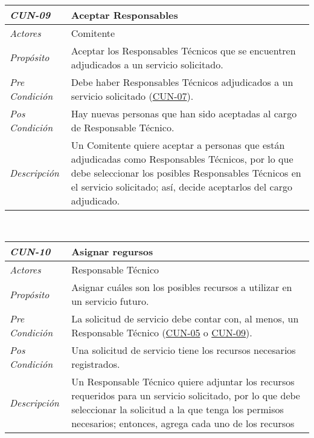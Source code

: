 \begin{center}
{\begin{tabular}{ | p{3cm} | p{12.5cm} | }
	\hline
\end{tabular}} \\[1cm]
\hypertarget{CUN-09}{%
\begin{tabular}{ | p{3cm} | p{12.5cm} | }
	\hline
	\rowcolor{lightgray}
	\hfil \textbf{\textit{CUN-09}} &
	\hfil \textbf{Aceptar Responsables} \\
	\hline
	\raggedleft \textit{Actores} & Comitente \\
	\hline
	\raggedleft \textit{Prop\'osito} & Aceptar los
	Responsables T\'ecnicos que se encuentren adjudicados
	a un servicio solicitado. \\
	\hline
	\raggedleft \textit{Pre Condici\'on} & Debe haber
	Responsables T\'ecnicos adjudicados a un servicio
	solicitado (\hyperlink{CUN-07}{CUN-07}). \\
	\hline
	\raggedleft \textit{Pos Condici\'on} & Hay nuevas
	personas que han sido aceptadas al cargo de
	Responsable T\'ecnico. \\
	\hline
	\raggedleft \textit{Descripci\'on} &
	Un Comitente quiere aceptar a personas que est\'an
	adjudicadas como Responsables T\'ecnicos, por lo que
	debe seleccionar los posibles Responsables T\'ecnicos
	en el servicio solicitado; as\'i, decide aceptarlos
	del cargo adjudicado. \\
	\hline
\end{tabular}} \\[1cm]
\hypertarget{CUN-10}{%
\begin{tabular}{ | p{3cm} | p{12.5cm} | }
	\hline
	\rowcolor{lightgray}
	\hfil \textbf{\textit{CUN-10}} &
	\hfil \textbf{Asignar regursos} \\
	\hline
	\raggedleft \textit{Actores} & Responsable T\'ecnico \\
	\hline
	\raggedleft \textit{Prop\'osito} & Asignar cu\'ales son
	los posibles recursos a utilizar en un servicio futuro. \\
	\hline
	\raggedleft \textit{Pre Condici\'on} & La solicitud
	de servicio debe contar con, al menos, un Responsable
	T\'ecnico (\hyperlink{CUN-05}{CUN-05} o 
	\hyperlink{CUN-09}{CUN-09}). \\
	\hline
	\raggedleft \textit{Pos Condici\'on} & Una solicitud
	de servicio tiene los recursos necesarios registrados. \\
	\hline
	\raggedleft \textit{Descripci\'on} &
	Un Responsable T\'ecnico quiere adjuntar los recursos
	requeridos para un servicio solicitado, por lo que debe
	seleccionar la solicitud a la que tenga los permisos
	necesarios; entonces, agrega cada uno de los recursos

\end{tabular}}
\end{center}
